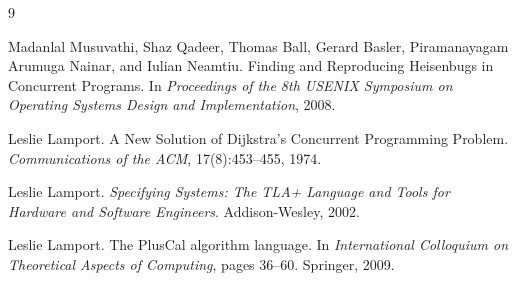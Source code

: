 \documentclass[11pt]{article}
\begin{document}
\begin{thebibliography}{9}

Madanlal Musuvathi, Shaz Qadeer, Thomas Ball, Gerard Basler, Piramanayagam Arumuga Nainar, and Iulian Neamtiu.
\newblock Finding and Reproducing Heisenbugs in Concurrent Programs.
\newblock In \emph{Proceedings of the 8th USENIX Symposium on Operating Systems Design and Implementation}, 2008.

Leslie Lamport.
\newblock A New Solution of Dijkstra's Concurrent Programming Problem.
\newblock \emph{Communications of the ACM}, 17(8):453--455, 1974.

Leslie Lamport.
\newblock \emph{Specifying Systems: The TLA+ Language and Tools for Hardware and Software Engineers}.
\newblock Addison-Wesley, 2002.

Leslie Lamport.
\newblock The PlusCal algorithm language.
\newblock In \emph{International Colloquium on Theoretical Aspects of Computing}, pages 36--60. Springer, 2009.

\end{thebibliography}
\end{document}

